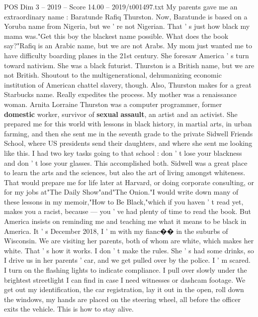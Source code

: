\begin{textsample}{POS Dim 3 – 2019 – Score 14.00 – 2019/t001497.txt}  \label{ex:f3_pos_007}
My parents gave me an extraordinary name : Baratunde Rafiq Thurston.
Now, Baratunde is based on a Yoruba name from Nigeria, but we ' re not Nigerian.
That ' s just how black my mama was."Get this boy the blackest name possible.
What does the book say?"Rafiq is an Arabic name, but we are not Arabs.
My mom just wanted me to have difficulty boarding planes in the 21st century.
She foresaw America ' s turn toward nativism.
She was a black futurist.
Thurston is a British name, but we are not British.
Shoutout to the multigenerational, dehumanizing economic institution of American chattel slavery, though.
Also, Thurston makes for a great Starbucks name.
Really expedites the process.
My mother was a renaissance woman.
Arnita Lorraine Thurston was a computer programmer, former \textbf{domestic} worker, survivor of \textbf{sexual} \textbf{assault}, an artist and an activist.
She prepared me for this world with lessons in black history, in martial arts, in urban farming, and then she sent me in the seventh grade to the private Sidwell Friends School, where US presidents send their daughters, and where she sent me looking like this.
I had two key tasks going to that school : don ' t lose your blackness and don ' t lose your glasses.
This accomplished both.
Sidwell was a great place to learn the arts and the sciences, but also the art of living amongst whiteness.
That would prepare me for life later at Harvard, or doing corporate consulting, or for my jobs at"The Daily Show"and"The Onion."I would write down many of these lessons in my memoir,"How to Be Black,"which if you haven ' t read yet, makes you a racist, because — you ' ve had plenty of time to read the book.
But America insists on reminding me and teaching me what it means to be black in America.
It ' s December 2018, I ' m with my fianc{\EmojiFont �}{\EmojiFont �} in the suburbs of Wisconsin.
We are visiting her parents, both of whom are white, which makes her white.
That ' s how it works.
I don ' t make the rules.
She ' s had some drinks, so I drive us in her parents ' car, and we get pulled over by the police.
I ' m scared.
I turn on the flashing lights to indicate compliance.
I pull over slowly under the brightest streetlight I can find in case I need witnesses or dashcam footage.
We get out my identification, the car registration, lay it out in the open, roll down the windows, my hands are placed on the steering wheel, all before the officer exits the vehicle.
This is how to stay alive.

\end{textsample}
